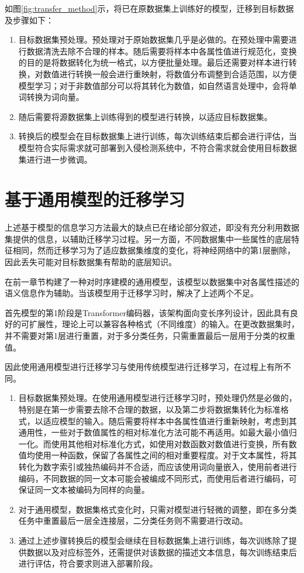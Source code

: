 如图\ref{fig:transfer_method}示，将已在原数据集上训练好的模型，迁移到目标数据及步骤如下：
\begin{enumerate}
    \item 目标数据集预处理。预处理对于原始数据集几乎是必做的。在预处理中需要进行数据清洗去除不合理的样本。随后需要将样本中各属性值进行规范化，变换的目的是将数据转化为统一格式，以方便批量处理。最后还需要对样本进行转换，对数值进行转换一般会进行重映射，将数值分布调整到合适范围，以方便模型学习；对于非数值部分可以将其转化为数值，如自然语言处理中，会将单词转换为词向量。
    \item 随后需要将源数据集上训练得到的模型进行转换，以适应目标数据集。
    \item 转换后的模型会在目标数据集上进行训练，每次训练结束后都会进行评估，当模型符合实际需求就可部署到入侵检测系统中，不符合需求就会使用目标数据集进行进一步微调。
\end{enumerate}

\section{基于通用模型的迁移学习}
上述基于模型的信息学习方法最大的缺点已在绪论部分叙述，即没有充分利用数据集提供的信息，以辅助迁移学习过程。另一方面，不同数据集中一些属性的底层特征相同，然而迁移学习为了适应数据集维度的变化，将神经网络中的第1层删除，因此丢失可能对目标数据集有帮助的底层知识。

在前一章节构建了一种对时序建模的通用模型，该模型以数据集中对各属性描述的语义信息作为辅助。当该模型用于迁移学习时，解决了上述两个不足。

首先模型的第1阶段是Transformer编码器，该架构面向变长序列设计，因此具有良好的可扩展性，理论上可以兼容各种格式（不同维度）的输入。在更改数据集时，并不需要对第1层进行重置，对于多分类任务，只需重置最后一层用于分类的权重值。

因此使用通用模型进行迁移学习与使用传统模型进行迁移学习，在过程上有所不同。
\begin{enumerate}
    \item 目标数据集预处理。在使用通用模型进行迁移学习时，预处理仍然是必做的，特别是在第一步需要去除不合理的数据，以及第二步将数据集转化为标准格式，以适应模型的输入。随后需要将样本中各属性值进行重新映射，考虑到其通用性，一些对于数值属性的相对标准化方法可能不再适用。如最大最小值归一化。而使用其他相对标准化方式，如使用对数函数对数值进行变换，所有数值均使用一种函数，保留了各属性之间的相对重要程度。对于文本属性，将其转化为数字索引或独热编码并不合适，而应该使用词向量嵌入，使用前者进行编码，不同数据的同一文本可能会被编成不同形式，而使用后者进行编码，可保证同一文本被编码为同样的向量。
    \item 对于通用模型，数据集格式变化时，只需对模型进行轻微的调整，即在多分类任务中重置最后一层全连接层，二分类任务则不需要进行改动。
    \item 通过上述步骤转换后的模型会继续在目标数据集上进行训练，每次训练除了提供数据以及对应标签外，还需提供对该数据的描述文本信息，每次训练结束后进行评估，符合要求则进入部署阶段。
\end{enumerate}

